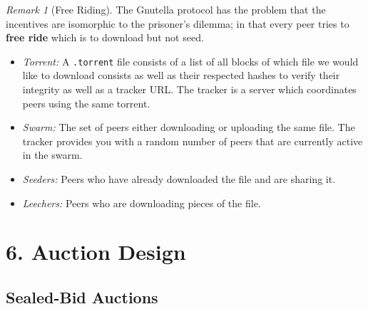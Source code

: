 \documentclass[12pt]{article}
\theoremstyle{definition}
\theoremstyle{remark}
\newtheorem*{remark}{Remark}
\begin{document}
\begin{remark}[Free Riding]
The Gnutella protocol has the problem that the incentives are isomorphic to the prisoner's dilemma; in that every peer tries to \textbf{free ride} which is to download but not seed.
\end{remark}


\begin{example}[BitTorrent]
	
\begin{itemize}
	\item \textit{Torrent:} A \texttt{.torrent} file consists of a list of all blocks of which file we would like to download consists as well as their respected hashes to verify their integrity as well as a tracker URL. The tracker is a server which coordinates peers using the same torrent.
	
	\item \textit{Swarm:} The set of peers either downloading or uploading the same file. The tracker provides you with a random number of peers that are currently active in the swarm.
	
	\item \textit{Seeders:} Peers who have already downloaded the file and are sharing it.
	
	\item \textit{Leechers:} Peers who are downloading pieces of the file.
\end{itemize}
\end{example}





\section*{6. Auction Design}

\subsection*{Sealed-Bid Auctions}
\end{document}

